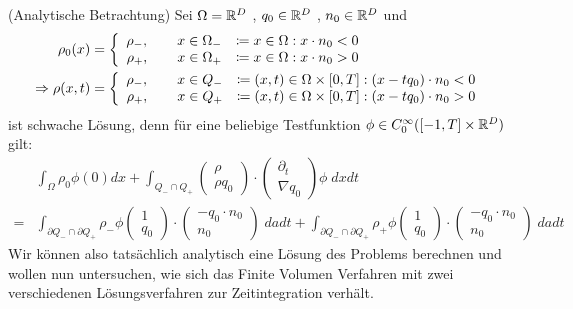 \begin{remark}(Analytische Betrachtung) \newline
Sei $\Omega = \mathbb{R} ^D$ , $q_0 \in \mathbb{R} ^D$ , $n_0 \in \mathbb{R} ^D$ und 
	\begin{align*}
		\rho_0 (x) &= 
			\left\{              
				\begin{array}{r l}
					\rho_- , \qquad x \in \Omega_- &\coloneqq {x \in \Omega : x \cdot n_0 < 0 } \\
					\rho_+ , \qquad x \in \Omega_+ &\coloneqq {x \in \Omega : x \cdot n_0 > 0 }
				\end{array}
			\right.  \\
			\Rightarrow \rho (x,t) &= 
				\left\{              
					\begin{array}{r l}
						\rho_- , \qquad x \in Q_- &\coloneqq {(x,t) \in \Omega \times [0,T] : (x - tq_0) \cdot n_0 < 0 } \\
						\rho_+ , \qquad x \in Q_+ &\coloneqq {(x,t) \in \Omega \times [0,T] : (x - tq_0) \cdot n_0 > 0 }
					\end{array}
				\right. 
	\end{align*}
	ist schwache Lösung, denn für eine beliebige Testfunktion $\phi \in C_0^{\infty} ([-1,T] \times \mathbb{R}^D)$ gilt:
	\begin{align*}
		&\int_{\Omega} \rho_0 \phi (0) dx + \int_{Q_- \cap Q_+ } 
				\begin{pmatrix}
       				\rho \\
       				\rho q_0
     			\end{pmatrix}
     		\cdot
     			\begin{pmatrix}
       				\partial_t \\
       				\nabla q_0
     			\end{pmatrix}
     		\phi \; dxdt  \\
     	= &\int_{ \partial Q_- \cap \partial Q_+ } \rho_- \phi
     		\begin{pmatrix}
       				1 \\
       				q_0
     			\end{pmatrix}
     		\cdot
     			\begin{pmatrix}
       				-q_0 \cdot n_0 \\
       				n_0
     			\end{pmatrix} 
     		\; da dt
     	+ \int_{ \partial Q_- \cap \partial Q_+ } \rho_+ \phi
     		\begin{pmatrix}
       				1 \\
       				q_0
     			\end{pmatrix}
     		\cdot
     			\begin{pmatrix}
       				-q_0 \cdot n_0 \\
       				n_0
     			\end{pmatrix} 
     		\; da dt	
	\end{align*}
	Wir können also tatsächlich analytisch eine Lösung des Problems berechnen und wollen nun untersuchen, wie sich das Finite Volumen Verfahren mit zwei verschiedenen Lösungsverfahren zur Zeitintegration verhält. 
	\end{remark} 
